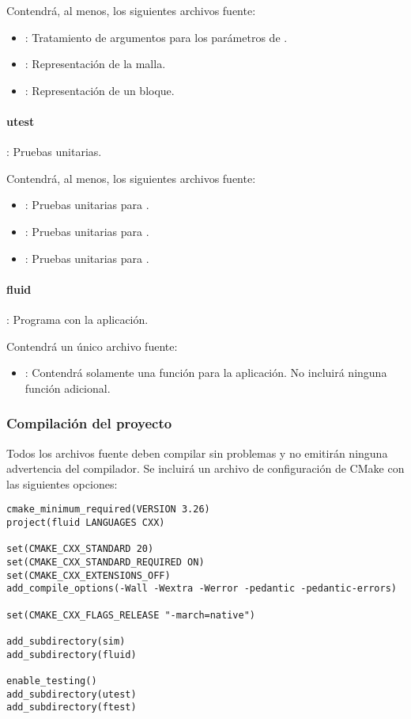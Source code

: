 Contendrá, al menos, los siguientes archivos fuente:
\begin{itemize}
  \item {}: 
        Tratamiento de argumentos para los parámetros de .
  \item {}: 
        Representación de la malla.
  \item {}: 
        Representación de un bloque.
\end{itemize}

\paragraph{utest}: Pruebas unitarias.

Contendrá, al menos, los siguientes archivos fuente:
\begin{itemize}
  \item {}: 
        Pruebas unitarias para .
  \item {}:
        Pruebas unitarias para .
  \item {}:
        Pruebas unitarias para .
\end{itemize}

\paragraph{fluid}: Programa con la aplicación.

Contendrá un único archivo fuente:
\begin{itemize}
  \item {}: 
        Contendrá solamente una función  para la aplicación.
        No incluirá ninguna función adicional.
\end{itemize}

\subsubsection{Compilación del proyecto}

Todos los archivos fuente deben compilar sin problemas y no emitirán ninguna
advertencia del compilador. Se incluirá un archivo de configuración de CMake
con las siguientes opciones:

\begin{lstlisting}[title={Main CmakeLists.txt},frame=single]
cmake_minimum_required(VERSION 3.26)
project(fluid LANGUAGES CXX)

set(CMAKE_CXX_STANDARD 20)
set(CMAKE_CXX_STANDARD_REQUIRED ON)
set(CMAKE_CXX_EXTENSIONS_OFF)
add_compile_options(-Wall -Wextra -Werror -pedantic -pedantic-errors)

set(CMAKE_CXX_FLAGS_RELEASE "-march=native")

add_subdirectory(sim)
add_subdirectory(fluid)

enable_testing()
add_subdirectory(utest)
add_subdirectory(ftest)
\end{lstlisting}

